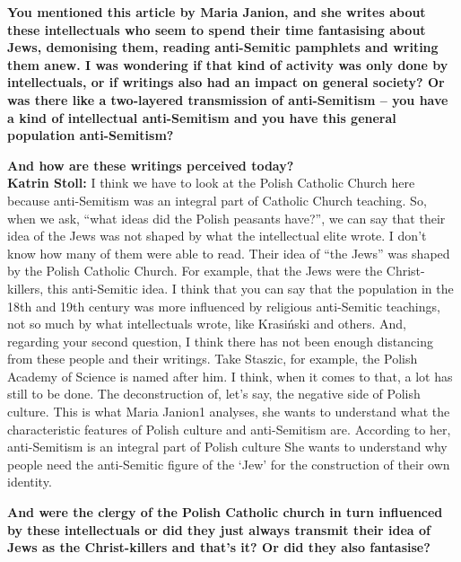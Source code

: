 \textbf{You mentioned this article by Maria Janion, and she writes about these intellectuals who seem to spend their time fantasising about Jews, demonising them, reading anti-Semitic pamphlets and writing them anew. I was wondering if that kind of activity was only done by intellectuals, or if writings also had an impact on general society? Or was there like a two-layered transmission of anti-Semitism – you have a kind of intellectual anti-Semitism and you have this general population anti-Semitism?}\par
\textbf{And how are these writings perceived today?}\\ 

\textbf{Katrin Stoll:} I think we have to look at the Polish Catholic Church here because anti-Semitism was an integral part of Catholic Church teaching. So, when we ask, “what ideas did the Polish peasants have?”, we can say that their idea of the Jews was not shaped by what the intellectual elite wrote. I don’t know how many of them were able to read. Their idea of “the Jews” was shaped by the Polish Catholic Church. For example, that the Jews were the Christ-killers, this anti-Semitic idea. I think that you can say that the population in the 18th and 19th century was more influenced by religious anti-Semitic teachings, not so much by what intellectuals wrote, like Krasiński and others. And, regarding your second question, I think there has not been enough distancing from these people and their writings. Take Staszic, for example, the Polish Academy of Science is named after him. I think, when it comes to that, a lot has still to be done. The deconstruction of, let’s say, the negative side of Polish culture. This is what Maria Janion1 analyses, she wants to understand what the characteristic features of Polish culture and anti-Semitism are. According to her, anti-Semitism is an integral part of Polish culture She wants to understand why people need the anti-Semitic figure of the ‘Jew’ for the construction of their own identity. 

\textbf{And were the clergy of the Polish Catholic church in turn influenced by these intellectuals or did they just always transmit their idea of Jews as the Christ-killers and that’s it? Or did they also fantasise?}

